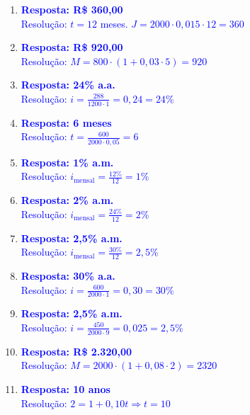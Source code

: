 \documentclass[11pt]{article}
\begin{document}
\begin{multicols}{2}
\begin{enumerate}[leftmargin=*, itemsep=2pt]
\item \textcolor{blue}{\textbf{Resposta: R\$ 360,00}} \\
\textcolor{blue}{Resolução: $t = 12$ meses. $J = 2000 \cdot 0,015 \cdot 12 = 360$}

\item \textcolor{blue}{\textbf{Resposta: R\$ 920,00}} \\
\textcolor{blue}{Resolução: $M = 800 \cdot (1 + 0,03 \cdot 5) = 920$}

\item \textcolor{blue}{\textbf{Resposta: 24\% a.a.}} \\
\textcolor{blue}{Resolução: $i = \frac{288}{1200 \cdot 1} = 0,24 = 24\%$}

\item \textcolor{blue}{\textbf{Resposta: 6 meses}} \\
\textcolor{blue}{Resolução: $t = \frac{600}{2000 \cdot 0,05} = 6$}

\item \textcolor{blue}{\textbf{Resposta: 1\% a.m.}} \\
\textcolor{blue}{Resolução: $i_{\text{mensal}} = \frac{12\%}{12} = 1\%$}

\item \textcolor{blue}{\textbf{Resposta: 2\% a.m.}} \\
\textcolor{blue}{Resolução: $i_{\text{mensal}} = \frac{24\%}{12} = 2\%$}

\item \textcolor{blue}{\textbf{Resposta: 2,5\% a.m.}} \\
\textcolor{blue}{Resolução: $i_{\text{mensal}} = \frac{30\%}{12} = 2,5\%$}

\item \textcolor{blue}{\textbf{Resposta: 30\% a.a.}} \\
\textcolor{blue}{Resolução: $i = \frac{600}{2000 \cdot 1} = 0,30 = 30\%$}

\item \textcolor{blue}{\textbf{Resposta: 2,5\% a.m.}} \\
\textcolor{blue}{Resolução: $i = \frac{450}{2000 \cdot 9} = 0,025 = 2,5\%$}

\item \textcolor{blue}{\textbf{Resposta: R\$ 2.320,00}} \\
\textcolor{blue}{Resolução: $M = 2000 \cdot (1 + 0,08 \cdot 2) = 2320$}

\item \textcolor{blue}{\textbf{Resposta: 10 anos}} \\
\textcolor{blue}{Resolução: $2 = 1 + 0,10t \Rightarrow t = 10$}


\end{enumerate}
\end{multicols}
\end{document}
